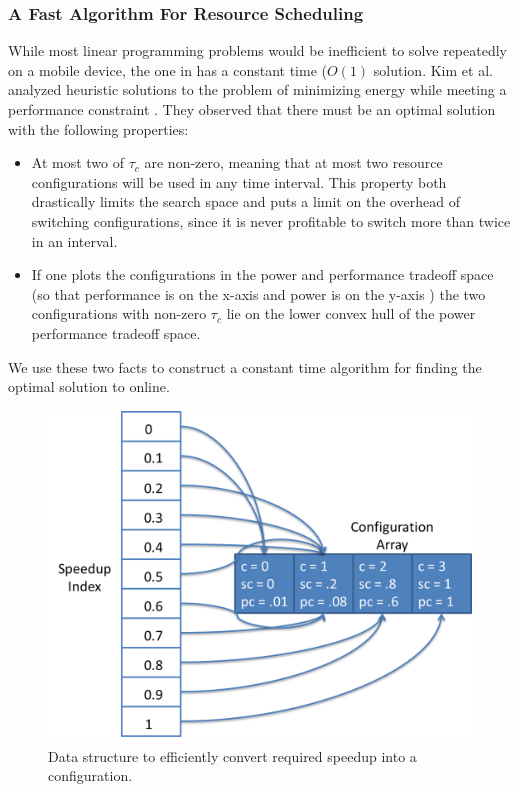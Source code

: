 \subsubsection{A Fast Algorithm For Resource Scheduling}
While most linear programming problems would be inefficient to solve
repeatedly on a mobile device, the one in  has a
constant time ($O(1)$ solution.  Kim et al. analyzed heuristic
solutions to the problem of minimizing energy while meeting a
performance constraint \cite{kim-cpsna}.  They observed that there
must be an optimal solution with the following properties:
\begin{itemize}
\item At most two of $\tau_c$ are non-zero, meaning that at most two
  resource configurations will be used in any time interval.  This
  property both drastically limits the search space and puts a limit
  on the overhead of switching configurations, since it is never
  profitable to switch more than twice in an interval.
\item If one plots the configurations in the power and performance
  tradeoff space (so that performance is on the x-axis and power is on
  the y-axis ) the two configurations with non-zero
  $\tau_c$ lie on the lower convex hull of the power performance
  tradeoff space.
\end{itemize}
We use these two facts to construct a constant time algorithm for
finding the optimal solution to  online.  


\begin{figure}
\includegraphics[width=\columnwidth]{figures/SpeedupHashTable.png}
\caption{Data structure to efficiently convert required speedup into a
  configuration.}
  \label{fig:pht}
\end{figure}

